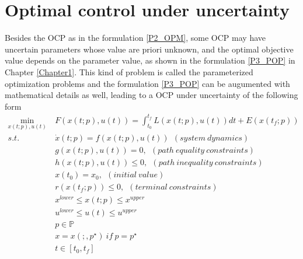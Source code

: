 \documentclass  [
  paper    = a4,
  BCOR     = 10mm,
  twoside,
  fontsize = 12pt,
  fleqn,
  toc      = bibnumbered,
  toc      = listofnumbered,
  numbers  = noendperiod,
  headings = normal,
  listof   = leveldown,
  version  = 3.03
]                                       {scrreprt}
\newcommand{\<}{\langle}
\renewcommand{\>}{\rangle}
\begin{document}
\chapter{Optimal control under uncertainty}
\label{Chapter3}
Besides the OCP as in the formulation \ref{P2_OPM}, some OCP may have uncertain parameters whose value are priori unknown, and the optimal objective value depends on the parameter value, as shown in the formulation \ref{P3_POP} in Chapter \ref{Chapter1}. This kind of problem is called the parameterized optimization problems and the  formulation \ref{P3_POP}  can be augumented with mathematical details as well, leading to a OCP under uncertainty of the following form
	\begin{subequations}
	\begin{align}
		\underset{x(t;p), u(t)}{\text{min}}   \ &  F(x(t;p), u(t))  = \int_{t_0}^{t_f}L(x(t;p), u(t))dt + E (x(t_f;p)) \label{P4_cost} \\
		s.t.\ \ &  \dot{x} (t;p) = f(x(t;p), u(t)) \ \ (system \ dynamics)   \label{P4_sd} \\
		& g(x(t;p), u(t)) = 0, \ \  (path\  equality\  constraints)  \label{P4_ec}\\
		& h(x(t;p), u(t)) \leq 0, \ \ (path\  inequality \ constraints)  \label{P4_inc}\\
		& x(t_0) = x_0, \ \ (initial \ value) \\
		& r(x(t_f; p)) \leq 0, \ \ (terminal \ constraints)  \label{P4_final} \\
		& x^{lower} \leq x(t;p) \leq x^{upper}   \label{P4_box_x} \\ 
		& u^{lower} \leq u(t) \leq u^{upper}   \label{P4_box_u} \\ 
		& p  \in   \mathbb{P}  \\
		& x = x(;,p^\star) \ if \ p = p^\star \\
		& t \in [t_0, t_f]
	\end{align}
	\label{P4_OCPPara}
\end{subequations}  
\end{document}
